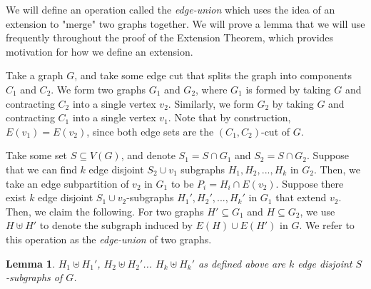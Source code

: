 \documentclass{article}
\newtheorem{lemma}{Lemma}[section]
\begin{document}
We will define an operation called the \emph{edge-union} which uses the idea of an extension to "merge" two graphs together. We will prove a lemma that we will use frequently throughout the proof of the Extension Theorem, which provides motivation for how we define an extension. 

Take a graph $G$, and take some edge cut that splits the graph into components $C_1$ and $C_2$. We form two graphs $G_1$ and $G_2$, where $G_1$ is formed by taking $G$ and contracting $C_2$ into a single vertex $v_2$. Similarly, we form $G_2$ by taking $G$ and contracting $C_1$ into a single vertex $v_1$. Note that by construction, $E(v_1)=E(v_2)$, since both edge sets are the $(C_1,C_2)$-cut of $G$. 

Take some set $S \subseteq V(G)$, and denote $S_1 = S \cap G_1$ and $S_2 = S \cap G_2$. Suppose that we can find $k$ edge disjoint $S_2 \cup v_1$ subgraphs $H_1,H_2,...,H_k$ in $G_2$. Then, we take an edge subpartition of $v_2$ in $G_1$ to be $P_i = H_i \cap E(v_2)$. Suppose there exist $k$ edge disjoint $S_1 \cup v_2$-subgraphs $H_1', H_2',...,H_k'$ in $G_1$ that extend $v_2$. Then, we claim the following. For two graphs $H' \subseteq G_1$ and $H \subseteq G_2$, we use $H \uplus H'$ to denote the subgraph induced by $E(H) \cup E(H')$ in $G$. We refer to this operation as the \emph{edge-union} of two graphs. 

\begin{lemma}
    $H_1 \uplus H_1'$, $H_2 \uplus H_2'$... $H_k \uplus H_k'$ as defined above are $k$ edge disjoint $S$-subgraphs of $G$.
\end{lemma}
\end{document}
